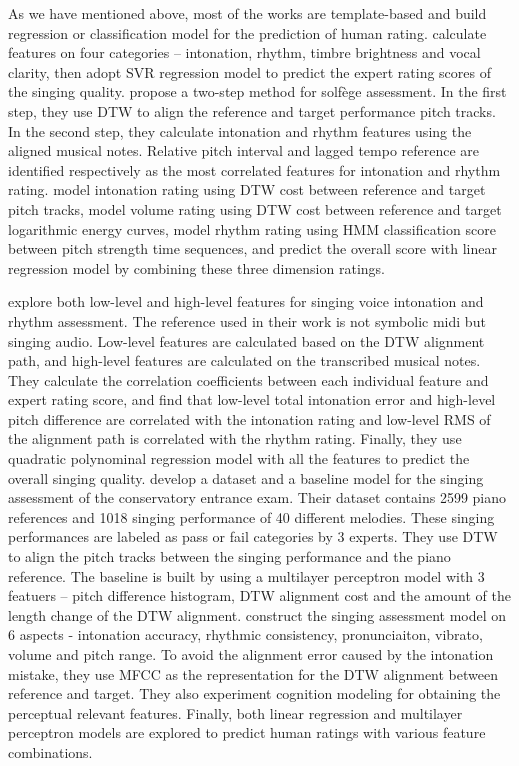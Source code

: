 As we have mentioned above, most of the works are template-based and build regression or classification model for the prediction of human rating.  calculate features on four categories -- intonation, rhythm, timbre brightness and vocal clarity, then adopt SVR regression model to predict the expert rating scores of the singing quality.  propose a two-step method for solfège assessment. In the first step, they use DTW to align the reference and target performance pitch tracks. In the second step, they calculate intonation and rhythm features using the aligned musical notes. Relative pitch interval and lagged tempo reference are identified respectively as the most correlated features for intonation and rhythm rating.  model intonation rating using DTW cost between reference and target pitch tracks, model volume rating using DTW cost between reference and target logarithmic energy curves, model rhythm rating using HMM classification score between pitch strength time sequences, and predict the overall score with linear regression model by combining these three dimension ratings. 

 explore both low-level and high-level features for singing voice intonation and rhythm assessment. The reference used in their work is not symbolic midi but singing audio. Low-level features are calculated based on the DTW alignment path, and high-level features are calculated on the transcribed musical notes. They calculate the correlation coefficients between each individual feature and expert rating score, and find that low-level total intonation error and high-level pitch difference are correlated with the intonation rating and low-level RMS of the alignment path is correlated with the rhythm rating. Finally, they use quadratic polynominal regression model with all the features to predict the overall singing quality.  develop a dataset and a baseline model for the singing assessment of the conservatory entrance exam. Their dataset contains 2599 piano references and 1018 singing performance of 40 different melodies. These singing performances are labeled as pass or fail categories by 3 experts. They use DTW to align the pitch tracks between the singing performance and the piano reference. The baseline is built by using a multilayer perceptron model with 3 featuers -- pitch difference histogram, DTW alignment cost and the amount of the length change of the DTW alignment.  construct the singing assessment model on 6 aspects - intonation accuracy, rhythmic consistency, pronunciaiton, vibrato, volume and pitch range. To avoid the alignment error caused by the intonation mistake, they use MFCC as the representation for the DTW alignment between reference and target. They also experiment cognition modeling for obtaining the perceptual relevant features. Finally, both linear regression and multilayer perceptron models are explored to predict human ratings with various feature combinations.

